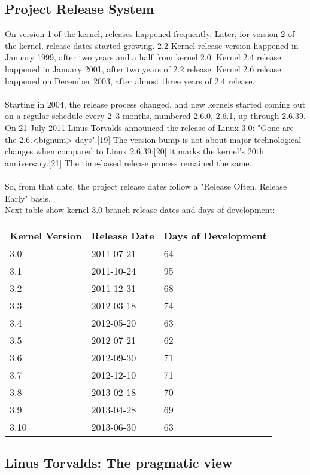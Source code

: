\documentclass[11pt]{article}
\begin{document}
\subsection{Project Release System}
On version 1 of the kernel, releases happened frequently. Later, for version 2 of the kernel, release dates started growing. 2.2 Kernel release version happened in January 1999, after two years and a half from kernel 2.0. Kernel 2.4 release happened in January 2001, after two years of 2.2 release. Kernel 2.6 release happened on December 2003, after almost three years of 2.4 release.\\
\\
Starting in 2004, the release process changed, and new kernels started coming out on a regular schedule every 2–3 months, numbered 2.6.0, 2.6.1, up through 2.6.39. On 21 July 2011 Linus Torvalds announced the release of Linux 3.0: "Gone are the 2.6.<bignum> days".[19] The version bump is not about major technological changes when compared to Linux 2.6.39;[20] it marks the kernel's 20th anniversary.[21] The time-based release process remained the same.\\
\\
So, from that date, the project release dates follow a "Release Often, Release Early" basis.\\
Next table show kernel 3.0 branch release dates and days of development:
\begin{center}
    \begin{tabular}{ | l | l | l | }
    \hline
    Kernel Version & Release Date & Days of Development\\
    \hline
    3.0  & 2011-07-21 & 64\\
    3.1  & 2011-10-24 & 95\\
    3.2  & 2011-12-31 & 68\\
    3.3  & 2012-03-18 & 74\\
    3.4  & 2012-05-20 & 63\\
    3.5  & 2012-07-21 & 62\\
    3.6  & 2012-09-30 & 71\\
    3.7  & 2012-12-10 & 71\\
    3.8  & 2013-02-18 & 70\\
    3.9  & 2013-04-28 & 69\\
    3.10 & 2013-06-30 & 63\\
    \hline
    \end{tabular}
\end{center}

\subsection{Linus Torvalds: The pragmatic view}
\end{document}

